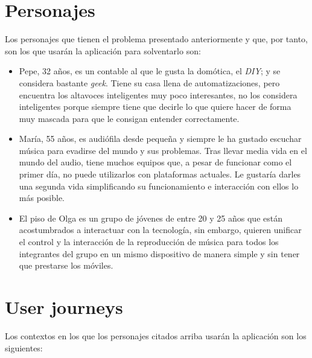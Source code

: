 \section{Personajes}
Los personajes que tienen el problema presentado anteriormente y que, por tanto,
son los que usarán la aplicación para solventarlo son:
\begin{itemize}
    \item Pepe, 32 años, es un contable al que le gusta la domótica, el
    \emph{DIY}; y se considera bastante \emph{geek}. Tiene su casa llena de
    automatizaciones, pero encuentra los altavoces inteligentes muy poco
    interesantes, no los considera inteligentes porque siempre tiene que decirle
    lo que quiere hacer de forma muy mascada para que le consigan entender
    correctamente. 
    \item María, 55 años, es audiófila desde pequeña y siempre le ha gustado
    escuchar música para evadirse del mundo y sus problemas. Tras llevar media
    vida en el mundo del audio, tiene muchos equipos que, a pesar de funcionar
    como el primer día, no puede utilizarlos con plataformas actuales. Le gustaría
    darles una segunda vida simplificando su funcionamiento e interacción con
    ellos lo más posible. 
    \item El piso de Olga es un grupo de jóvenes de entre 20 y 25 años que están
    acostumbrados a interactuar con la tecnología, sin embargo, quieren unificar el control y la
    interacción de la reproducción de música para todos los integrantes del
    grupo en un mismo dispositivo de manera simple y sin tener que prestarse los
    móviles.
\end{itemize}

\section{User journeys}
Los contextos en los que los personajes citados arriba usarán la aplicación son
los siguientes:\\

